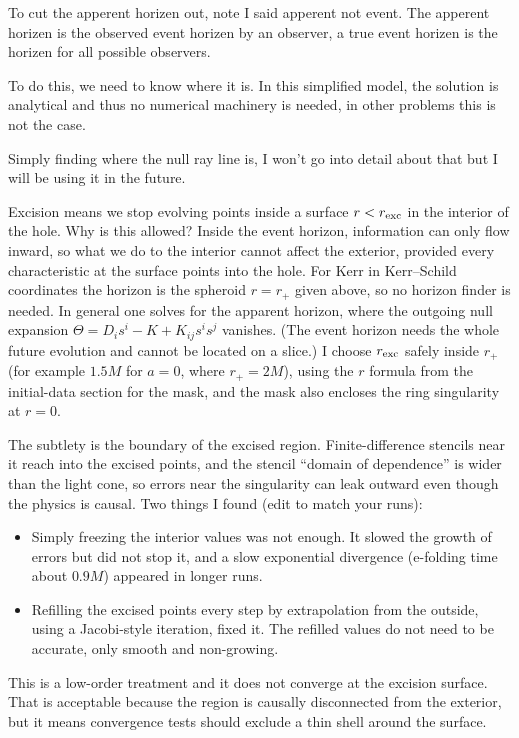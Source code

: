 To cut the apperent horizen out, note I said apperent not event. The apperent horizen is the observed event horizen by an observer, a true event horizen is the horizen for all possible observers.

To do this, we need to know where it is. In this simplified model, the solution is analytical and thus no numerical machinery is needed, in other problems this is not the case.

Simply finding where the null ray line is, I won't go into detail about that but I will be using it in the future.


Excision means we stop evolving points inside a surface $r<r_{\rm exc}$ in the interior
of the hole. Why is this allowed? Inside the event horizon, information can only flow
inward, so what we do to the interior cannot affect the exterior, provided every
characteristic at the surface points into the hole. For Kerr in Kerr--Schild
coordinates the horizon is the spheroid $r=r_+$ given above, so no horizon finder is
needed. In general one solves for the apparent horizon, where the outgoing null
expansion $\Theta=D_is^i-K+K_{ij}s^is^j$ vanishes. (The event horizon needs the whole
future evolution and cannot be located on a slice.) I choose $r_{\rm exc}$ safely inside $r_+$
(for example $1.5M$ for $a=0$, where $r_+=2M$), using the $r$ formula from the
initial-data section for the mask, and the mask also encloses the ring singularity at $r=0$.

The subtlety is the boundary of the excised region. Finite-difference stencils near it
reach into the excised points, and the stencil ``domain of dependence'' is wider than the
light cone, so errors near the singularity can leak outward even though the physics
is causal. Two things I found (edit to match your runs):
\begin{itemize}
	\item Simply freezing the interior values was not enough. It slowed the growth of errors
	      but did not stop it, and a slow exponential divergence (e-folding time about $0.9M$)
	      appeared in longer runs.
	\item Refilling the excised points every step by extrapolation from the outside, using a Jacobi-style iteration,
	      fixed it. The refilled values do not need to be accurate, only smooth and non-growing.
\end{itemize}
This is a low-order treatment and it does not converge at the excision surface. That is
acceptable because the region is causally disconnected from the exterior, but it means
convergence tests should exclude a thin shell around the surface.



